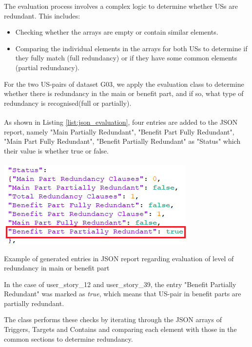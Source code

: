 The evaluation process involves a complex logic to determine whether USs are redundant. This includes:
\begin{itemize}
	\item Checking whether the arrays are empty or contain similar elements.
	\item Comparing the individual elements in the arrays for both USs to determine if they fully match (full redundancy) or if they have some common elements (partial redundancy).
\end{itemize}
\begin{example}
	For the two US-pairs of dataset G03, we apply the evaluation class to determine whether there is redundancy in the main or benefit part, and if so, what type of redundancy is recognised(full or partially).\\\\
	As shown in Listing \ref{list:json_evaluation}, four entries are added to the JSON report, namely "Main Partially Redundant", "Benefit Part Fully Redundant",
	"Main Part Fully Redundant", "Benefit Partially Redundant" as "Status" which their value is whether true or false. 
	\begin{MyListing}
		\paragraph{}
		
		\centering
		\includegraphics[scale=0.7]{Listing/json_evaluation.png}
		\caption{Example of generated entries in JSON report regarding evaluation of level of redundancy in main or benefit part}\label{list:json_evaluation}
		
	\end{MyListing}	
	
	In the case of user\_story\_12 and user\_story\_39, the entry "Benefit Partially Redundant" was marked as \textit{true}, which means that US-pair in benefit parts are partially redundant.
	
\end{example}
The class performs these checks by iterating through the JSON arrays of Triggers, Targets and Contains and comparing each element with those in the common sections to determine redundancy.


